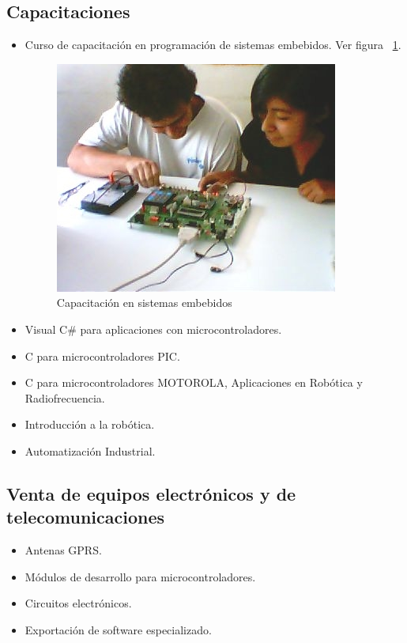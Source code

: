\subsection{Capacitaciones}
\begin{itemize}
  \item Curso de capacitación en programación de sistemas embebidos. Ver figura ~\ref{fig:capacitaciones}.
    \begin{figure}[h!]
      \centering
      \includegraphics[scale=0.5]{images/company/capacitaciones.jpg}
      \caption{Capacitación en sistemas embebidos}
      \label{fig:capacitaciones}
    \end{figure}
  \item Visual C\# para aplicaciones con microcontroladores.
  \item C para microcontroladores PIC.
  \item C para microcontroladores MOTOROLA, Aplicaciones en Robótica y
  Radiofrecuencia.
  \item Introducción a la robótica.
  \item Automatización Industrial.
\end{itemize}

\subsection{Venta de equipos electrónicos y de telecomunicaciones}
\begin{itemize}
  \item Antenas GPRS.
  \item Módulos de desarrollo para microcontroladores.
  \item Circuitos electrónicos.
  \item Exportación de software especializado.
\end{itemize}


